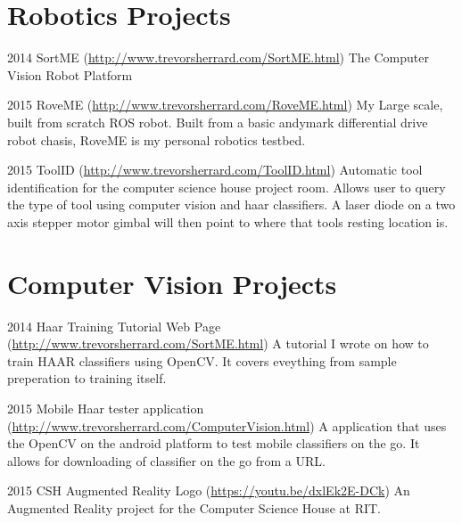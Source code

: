 \documentclass{tccv}
\begin{document}
\section{Robotics Projects}

\begin{yearlist}

\item{2014}
     {SortME (\href{http://www.trevorsherrard.com/SortME.html}{http://www.trevorsherrard.com\newline/SortME.html})}
     {The Computer Vision Robot Platform}
     
\item{2015}
     {RoveME (\href{http://www.trevorsherrard.com/RoveME.html}{http://www.trevorsherrard.com\newline/RoveME.html})}
     {My Large scale, built from scratch ROS robot. Built from a basic andymark differential drive robot chasis, RoveME is my personal robotics testbed.}
     
\item{2015}
	{ToolID (\href{http://www.trevorsherrard.com/ToolID.html}
	{http://www.trevorsherrard.com\newline/ToolID.html})}
	{Automatic tool identification for the computer science house project room. Allows user to query the type of tool using computer vision and haar classifiers. A laser diode on a two axis stepper motor gimbal will then point to where that tools resting location is.}

\end{yearlist}


\section{Computer Vision Projects}

\begin{yearlist}

\item{2014}
     {Haar Training Tutorial Web Page (\href{http://www.trevorsherrard.com/SortME.html}{http://www.trevorsherrard.com\newline/SortME.html})}
     {A tutorial I wrote on how to train HAAR classifiers using OpenCV. It covers eveything from sample preperation to training itself.}
     
\item{2015}
     {Mobile Haar tester application (\href{http://www.trevorsherrard.com/ComputerVision.html}{http://www.trevorsherrard.com\newline/ComputerVision.html})}
     {A application that uses the OpenCV on the android platform to test mobile classifiers on the go. It allows for downloading of classifier on the go from a URL.}
     
\item{2015}
     {CSH Augmented Reality Logo (\href{https://youtu.be/dxlEk2E-DCk}{https://youtu.be/dxlEk2E-DCk})}
     {An Augmented Reality project for the Computer Science House at RIT. }

\end{yearlist}
\end{document}
